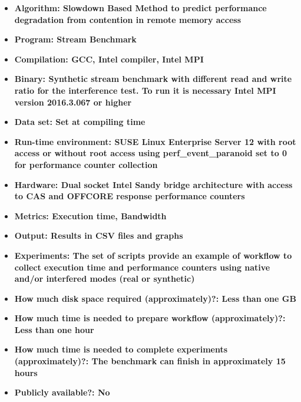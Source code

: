\documentclass{sigplanconf}
\begin{document}
{\small
\begin{itemize}
  \item {\bf Algorithm: Slowdown Based Method to predict performance degradation from contention in remote memory access}
  \item {\bf Program: Stream Benchmark}
  \item {\bf Compilation: GCC, Intel compiler, Intel MPI}
  \item {\bf Binary: Synthetic stream benchmark with different read and write ratio for the interference test. To run it is necessary Intel MPI version 2016.3.067 or higher }
  \item {\bf Data set: Set at compiling time }
  \item {\bf Run-time environment: SUSE Linux Enterprise Server 12 with root access or without root access using perf\_event\_paranoid set to 0 for performance counter collection }
  \item {\bf Hardware: Dual socket Intel Sandy bridge architecture with access to CAS and OFFCORE response performance counters}
  \item {\bf Metrics: Execution time, Bandwidth}
  \item {\bf Output: Results in CSV files and graphs}
  \item {\bf Experiments: The set of scripts provide an example of workflow to collect execution time and performance counters using native and/or interfered modes (real or synthetic)}
  \item {\bf How much disk space required (approximately)?: Less than one GB}
  \item {\bf How much time is needed to prepare workflow (approximately)?: Less than one hour }
  \item {\bf How much time is needed to complete experiments (approximately)?: The benchmark can finish in approximately 15 hours }
  \item {\bf Publicly available?: No}
\end{itemize}

}
\end{document}

